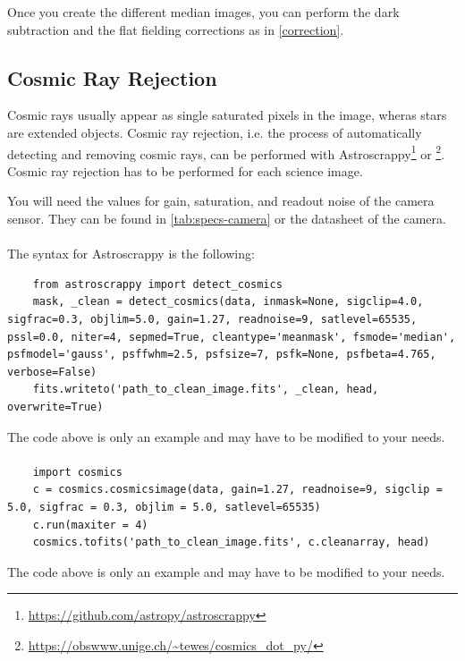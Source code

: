 \documentclass[a4paper, 11pt, fleqn]{memoir}
\begin{document}
Once you create the different median images, you can perform the dark subtraction and the flat fielding corrections as in \ref{correction}.

\subsection{Cosmic Ray Rejection}
\label{ssec:cosmic-ray-rejection}
Cosmic rays usually appear as single saturated pixels in the image, wheras stars are extended objects.
Cosmic ray rejection, i.e. the process of automatically detecting and removing cosmic rays, can be performed with Astroscrappy\footnote{\url{https://github.com/astropy/astroscrappy}} or \footnote{\url{https://obswww.unige.ch/~tewes/cosmics_dot_py/}}.
Cosmic ray rejection has to be performed for each science image.

You will need the values for gain, saturation, and readout noise of the camera sensor.
They can be found in \cref{tab:specs-camera} or the datasheet of the camera.

\paragraph{}
The syntax for Astroscrappy is the following:
\begin{verbatim}
    from astroscrappy import detect_cosmics
    mask, _clean = detect_cosmics(data, inmask=None, sigclip=4.0, sigfrac=0.3, objlim=5.0, gain=1.27, readnoise=9, satlevel=65535, pssl=0.0, niter=4, sepmed=True, cleantype='meanmask', fsmode='median', psfmodel='gauss', psffwhm=2.5, psfsize=7, psfk=None, psfbeta=4.765, verbose=False)
    fits.writeto('path_to_clean_image.fits', _clean, head, overwrite=True)
\end{verbatim}
The code above is only an example and may have to be modified to your needs.

\paragraph{}
\begin{verbatim}
    import cosmics
    c = cosmics.cosmicsimage(data, gain=1.27, readnoise=9, sigclip = 5.0, sigfrac = 0.3, objlim = 5.0, satlevel=65535)
    c.run(maxiter = 4)
    cosmics.tofits('path_to_clean_image.fits', c.cleanarray, head)
\end{verbatim}
The code above is only an example and may have to be modified to your needs.
\end{document}
